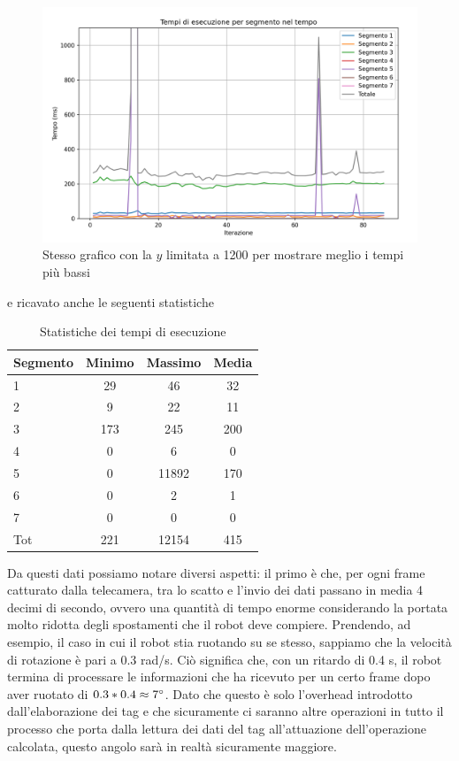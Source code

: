 \documentclass[]{article}
\begin{document}
\begin{figure}[H]
    \centering
    \includegraphics[width=0.7\linewidth]{immagini/grafico_tags_prima_delle_modifiche.png}
    \caption{Stesso grafico con la $y$ limitata a 1200 per mostrare meglio i tempi più bassi}
\end{figure}
e ricavato anche le seguenti statistiche
\begin{table}[H]
    \centering
    \begin{tabular}{lccc}
        \toprule
        Segmento & Minimo & Massimo & Media \\
        \midrule
        1        & 29     & 46      & 32    \\
        2        & 9      & 22      & 11    \\
        3        & 173    & 245     & 200   \\
        4        & 0      & 6       & 0     \\
        5        & 0      & 11892   & 170   \\
        6        & 0      & 2       & 1     \\
        7        & 0      & 0       & 0     \\
        \midrule
        Tot      & 221    & 12154   & 415   \\
        \bottomrule
    \end{tabular}
    \caption{Statistiche dei tempi di esecuzione}

\end{table}
Da questi dati possiamo notare diversi aspetti: il primo è che, per ogni frame catturato dalla telecamera, tra lo scatto e l'invio dei dati passano in media 4 decimi di secondo, ovvero una quantità di tempo enorme considerando la portata molto ridotta degli spostamenti che il robot deve compiere. Prendendo, ad esempio, il caso in cui il robot stia ruotando su se stesso, sappiamo che la velocità di rotazione è pari a 0.3 rad/s. Ciò significa che, con un ritardo di 0.4 s, il robot termina di processare le informazioni che ha ricevuto per un certo frame dopo aver ruotato di $0.3 * 0.4 \approx 7 \degree$. Dato che questo è solo l'overhead introdotto dall'elaborazione dei tag e che sicuramente ci saranno altre operazioni in tutto il processo che porta dalla lettura dei dati del tag all'attuazione dell'operazione calcolata, questo angolo sarà in realtà sicuramente maggiore.
\end{document}
